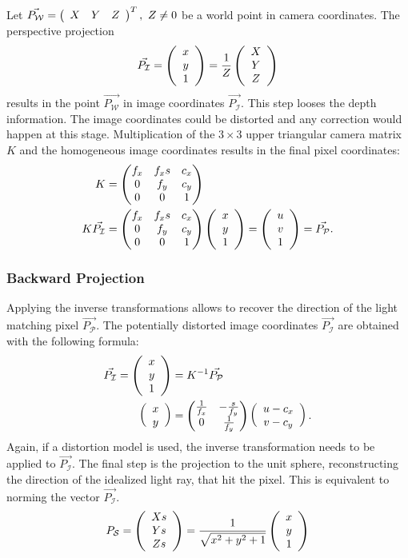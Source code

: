 Let $\vec{P_\mathcal{W}} = \left(\begin{array}{ccc} X & Y & Z \end{array}\right)^T,~Z \neq 0$ be a world point in camera coordinates.
The perspective projection
\begin{equation}
    \vec{P_\mathcal{I}} = \left(\begin{array}{c} x \\ y \\ 1 \end{array}\right) = \frac{1}{Z}\left(\begin{array}{c} X \\ Y \\ Z \end{array}\right)
    \label{eq:pinhole_forward}
\end{equation}
results in the point $\vec{P_\mathcal{W}}$ in image coordinates $\vec{P_\mathcal{I}}$. This step looses the depth information.
The image coordinates could be distorted and any correction would happen at this stage.
Multiplication of the $3 \times 3$ upper triangular camera matrix $K$ and the homogeneous image coordinates results in the final pixel coordinates:
\begin{equation}
\begin{aligned}
K &= \begin{pmatrix}
        f_x & f_x s & c_x \\
        0   & f_y   & c_y \\
        0   & 0     & 1
     \end{pmatrix} \\
    K \vec{P_\mathcal{I}} &= \begin{pmatrix}
        f_x & f_x s & c_x \\
        0   & f_y   & c_y \\
        0   & 0     & 1
    \end{pmatrix}\left(\begin{array}{c} x \\ y \\ 1 \end{array}\right) = \left(\begin{array}{c} u \\ v \\ 1 \end{array}\right) = \vec{P_\mathcal{P}}\text{.}
\end{aligned}
\end{equation}

\subsubsection*{Backward Projection}

Applying the inverse transformations allows to recover the direction of the light matching pixel $\vec{P_\mathcal{P}}$.
The potentially distorted image coordinates $\vec{P_\mathcal{I}}$ are obtained with the following formula:
\begin{equation}
\begin{aligned}
    \vec{P_\mathcal{I}} = \left(\begin{array}{c} x \\ y \\ 1 \end{array}\right) &= K^{-1} \vec{P_\mathcal{P}} \\
    \left(\begin{array}{c} x \\ y \end{array}\right) &= \begin{pmatrix}\frac{1}{f_x} & -\frac{s}{f_y} \\ 0 & \frac{1}{f_y}\end{pmatrix} \left(\begin{array}{c} u - c_x \\ v - c_y \end{array}\right)\text{.}
\end{aligned}
\end{equation}
Again, if a distortion model is used, the inverse transformation needs to be applied to $\vec{P_\mathcal{I}}$.
The final step is the projection to the unit sphere, reconstructing the direction of the idealized light ray, that hit the pixel.
This is equivalent to norming the vector $\vec{P_\mathcal{I}}$.
\begin{equation}
    P_\mathcal{S} = \left(\begin{array}{c} Xs \\ Ys \\ Zs \end{array}\right) = \frac{1}{\sqrt{x^2 + y^2 + 1}} \left(\begin{array}{c} x \\ y \\ 1 \end{array}\right)
    \label{eq:pinhole_backward}
\end{equation}

